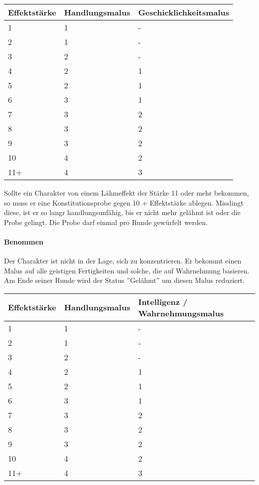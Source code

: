 \documentclass{article}
\begin{document}
\begin{small}
\begin{tabular}{|m{2cm}|m{3cm}|m{6cm}|}
\hline
\textbf{Effektstärke}&\textbf{Handlungsmalus}&\textbf{Geschicklichkeitsmalus}\\
\hline
\hline
1&1&-\\
\hline
2&1&-\\
\hline
3&2&-\\
\hline
4&2&1\\
\hline
5&2&1\\
\hline
6&3&1\\
\hline
7&3&2\\
\hline
8&3&2\\
\hline
9&3&2\\
\hline
10&4&2\\
\hline
11+&4&3\\
\hline
\end{tabular}
\end{small}

Sollte ein Charakter von einem Lähmeffekt der Stärke 11 oder mehr bekommen, so muss er eine Konstitutionsprobe gegen
10 + Effektstärke ablegen. Misslingt diese, ist er so langr handlungsunfähig, bis er nicht mehr gelähmt ist oder die Probe
gelingt. Die Probe darf einmal pro Runde gewürfelt werden.

\paragraph{Benommen}

Der Charakter ist nicht in der Lage, sich zu konzentrieren. Er bekommt einen Malus auf alle geistigen Fertigkeiten und
solche, die auf Wahrnehmung basieren. Am Ende seiner Runde wird der Status ''Gelähmt'' um diesen Malus reduziert.


\begin{small}
\begin{tabular}{|m{2cm}|m{3cm}|m{6cm}|}
\hline
\textbf{Effektstärke}&\textbf{Handlungsmalus}&\textbf{Intelligenz / Wahrnehmungsmalus}\\
\hline
\hline
1&1&-\\
\hline
2&1&-\\
\hline
3&2&-\\
\hline
4&2&1\\
\hline
5&2&1\\
\hline
6&3&1\\
\hline
7&3&2\\
\hline
8&3&2\\
\hline
9&3&2\\
\hline
10&4&2& \\
\hline
11+&4&3\\
\hline
\end{tabular}
\end{small}
\end{document}
